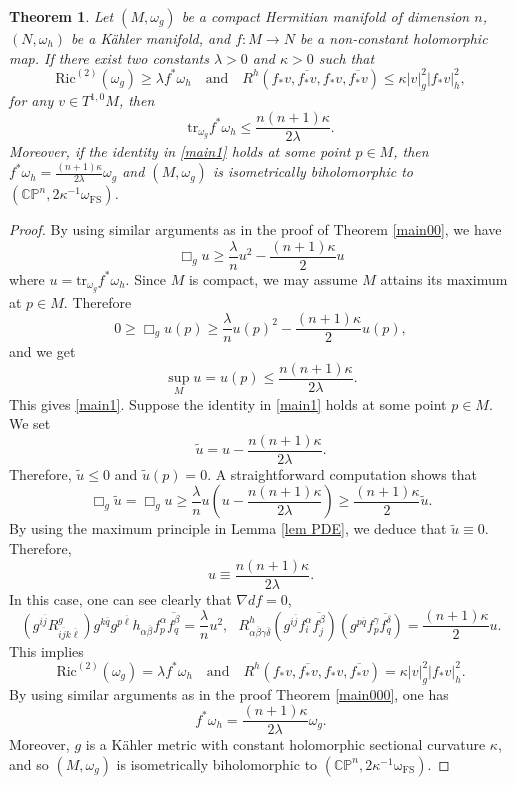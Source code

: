 \documentclass[12pt]{amsart}
\theoremstyle{plain}
\newtheorem{thm}{Theorem}[section]
\theoremstyle{definition}
\newcommand{\btheorem}{\begin{thm}}
\newcommand{\etheorem}{\end{thm}}
\newcommand{\bproof}{\begin{proof}}
\newcommand{\eproof}{\end{proof}}
\renewcommand{\bar}{\overline}
\newcommand{\beq}{\begin{equation}}
\newcommand{\eeq}{\end{equation}}
\renewcommand{\hat}{\widehat}
\renewcommand{\tilde}{\widetilde}
\newcommand{\qtq}[1]{\quad\mbox{#1}\quad}
\renewcommand{\>}{\rightarrow}
\newcommand{\C}{{\mathbb C}}
\renewcommand{\P}{{\mathbb P}}
\newcommand{\Ric}{\mathrm{Ric}}
\newcommand{\om}{\omega}
\numberwithin{equation}{section} %
\begin{document}
\btheorem \label{thm main1}  Let $(M,\om_g)$ be a compact Hermitian manifold of dimension $n$, $(N,\om_h)$ be a K\"ahler manifold,
and $f:M\to N$ be a non-constant holomorphic map.
If there exist two constants $\lambda>0$ and $\kappa>0$ such that 
\beq 
\Ric^{\mathrm{(2)}}(\omega_g)\ge \lambda f^* \omega_h\qtq{and} R^h\left(f_*v,\bar{f_*v}, f_*v,\bar {f_*v}\right)\le \kappa |v|^2_g |f_*v|^2_h, \label{Schwarz1 curvature condition}
\eeq 	
for any $v\in T^{1,0}M$, then \beq \mathrm{tr}_{\omega_g}f^*
\omega_h\le \frac{n(n+1)\kappa}{2\lambda}.\label{main1} \eeq
Moreover, if the identity in \eqref{main1} holds at some point $p\in
M$, then $f^*\omega_h=\frac{(n+1)\kappa}{2\lambda}\omega_g$ and $(M,\om_g)$ is
isometrically biholomorphic to $\left(\C\P^n, 2\kappa^{-1}
\om_{\mathrm{FS}}\right)$. \etheorem
\bproof  By using similar arguments as in the proof of Theorem \ref{main00},
we have
\beq
\Box_g u \geq   \frac{\lambda}{n}u^2 - \frac{(n+1)\kappa }{2} u \label{Schwarz1 final inequality}
\eeq
where $u=\mbox{tr}_{\omega_g} f^*\omega_h$.
    Since $M$ is compact, we may assume $M$ attains its maximum at $p\in M$. Therefore
    \[
    0\ge \Box_g u(p) \ge  \frac{\lambda}{n}u(p)^2 - \frac{(n+1)\kappa }{2} u(p),
    \]
    and we get
    \[
    \sup_M u=u(p)\le \frac{n(n+1)\kappa}{2\lambda}.
    \]
    This gives \eqref{main1}.
    Suppose the identity in \eqref{main1} holds at some point $p\in M$. We set $$\tilde u=u-\frac{n(n+1)\kappa}{2\lambda}.$$
    Therefore, $\tilde u\leq 0$ and $\tilde u(p)=0$.  A straightforward computation shows that
    \beq
    \Box_g \tilde u=\Box_g u
    \ge \frac{\lambda}{n}u \left(u-\frac{n(n+1)\kappa}{2\lambda}\right)
    \ge\frac{(n+1)\kappa}{2}\tilde u.
    \eeq
    By using the maximum principle in Lemma \ref{lem PDE}, we deduce that $\tilde u\equiv 0$. Therefore,
    \beq
    u\equiv \frac{n(n+1)\kappa}{2\lambda}.\label{Schwarz1 rigidity3}
    \eeq
In this case, one can see clearly that $\nabla df=0$, 
\beq  \left(g^{i\bar j} R^g_{i\bar j k\bar \ell} \right)g^{k\bar q} g^{p\bar \ell} h_{\alpha\bar\beta} f^{\alpha }_p \bar{f^\beta_q}= \frac{\lambda}{n}u^2, \ \ \ 
 R^h_{\alpha\bar\beta\gamma\bar\delta}\left(g^{i\bar j} f^{\alpha}_i \bar{f^{\beta}_j} \right)  \left(g^{p\bar q}  f^\gamma_p \bar{f^\delta_q} \right)=  \frac{(n+1)\kappa }{2} u. \eeq 
  This implies 
    $$ \Ric^{\mathrm{(2)}}(\omega_g)= \lambda f^* \omega_h\qtq{and} R^h\left(f_*v,\bar{f_*v}, f_*v,\bar {f_*v}\right)= \kappa |v|^2_g |f_*v|^2_h.$$ By using similar arguments as in the proof  Theorem \ref{main000}, one has $$ f^*\omega_h=\frac{(n+1)\kappa}{2\lambda}\omega_g.$$
    Moreover, $g$ is a K\"ahler metric with constant holomorphic sectional curvature $\kappa$,
    and so $(M,\om_g)$ is isometrically biholomorphic to $\left(\C\P^n,2\kappa^{-1}\mathrm{\om_{\mathrm{FS}}}\right)$. \eproof
\end{document}
